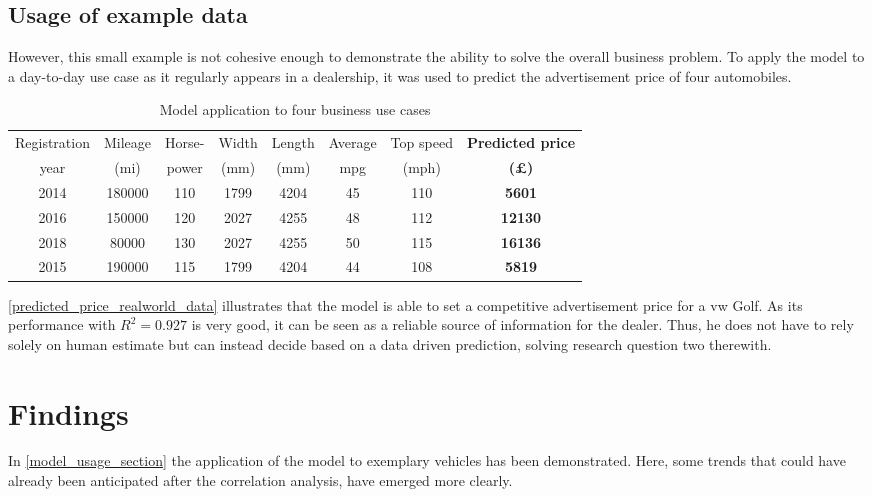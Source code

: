 \subsection{Usage of example data}
However, this small example is not cohesive enough to demonstrate the ability to solve the overall business problem.
To apply the model to a day-to-day use case as it regularly appears in a dealership,
it was used to predict the advertisement price of four automobiles.
\begin{table}[H]
    \begin{adjustbox}{width={\textwidth}}
        \begin{tabular}{|c|c|c|c|c|c|c|c|}
            \hline
            Registration & Mileage & Horse- & Width & Length & Average & Top speed & \textbf{Predicted price} \\[-1ex]
            year         & (mi)    & power  & (mm)  & (mm)   & mpg     & (mph)     & \textbf{(£)}             \\ \hline
            2014         & 180000  & 110    & 1799  & 4204   & 45      & 110       & \textbf{5601}            \\\hline
            2016         & 150000  & 120    & 2027  & 4255   & 48      & 112       & \textbf{12130}           \\\hline
            2018         & 80000   & 130    & 2027  & 4255   & 50      & 115       & \textbf{16136}           \\\hline
            2015         & 190000  & 115    & 1799  & 4204   & 44      & 108       & \textbf{5819}            \\ \hline
        \end{tabular}
    \end{adjustbox}
    \caption{Model application to four business use cases}
    \label{predicted_price_realworld_data}
\end{table}
\autoref{predicted_price_realworld_data} illustrates that the model is able to set a competitive advertisement price
for a \ac{vw} Golf. As its performance with $R^2 = 0.927$ is very good, it can be seen as a reliable source of information for the dealer.
Thus, he does not have to rely solely on human estimate but can instead decide based on a data driven prediction, solving research question two therewith. 
\section{Findings}
In \autoref{model_usage_section} the application of the model to exemplary vehicles has been demonstrated.
Here, some trends that could have already been anticipated after the correlation analysis, have emerged more clearly.
